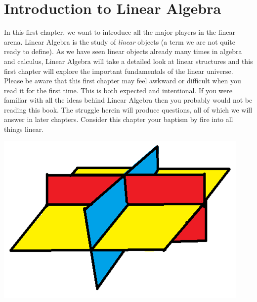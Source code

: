 \chapter{Introduction to Linear Algebra}\label{chap:linear}

In this first chapter, we want to introduce all the major players in the linear arena. Linear Algebra is the study of \emph{linear} objects (a term we are not quite ready to define). As we have seen linear objects already many times in algebra and calculus, Linear Algebra will take a detailed look at linear structures and this first chapter will explore the important fundamentals of the linear universe.\\

Please be aware that this first chapter may feel awkward or difficult when you read it for the first time. This is both expected and intentional. If you were familiar with all the ideas behind Linear Algebra then you probably would not be reading this book. The struggle herein will produce questions, all of which we will answer in later chapters. Consider this chapter your baptism by fire into all things linear.


\begin{center}
\includegraphics[scale=1]{Chapter1/images/Chapter1cover.png}%
\end{center}

\pagebreak